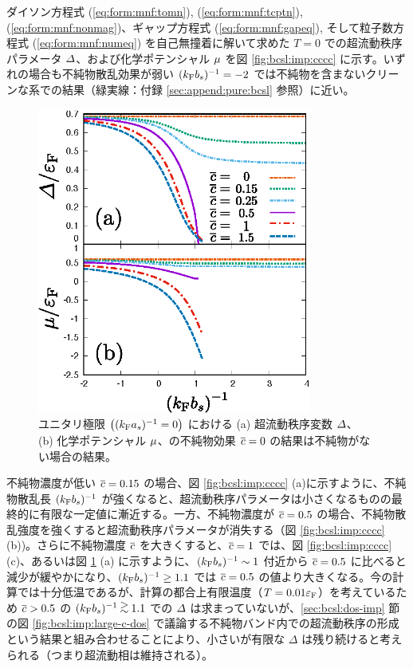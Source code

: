 ダイソン方程式 (\ref{eq:form:mnf:tomn}), (\ref{eq:form:mnf:tcptn}), (\ref{eq:form:mnf:nonmag})、ギャップ方程式 (\ref{eq:form:mnf:gapeq}), そして粒子数方程式 (\ref{eq:form:mnf:numeq}) を自己無撞着に解いて求めた $T=0$ での超流動秩序パラメータ $\varDelta$、および化学ポテンシャル $\mu$ を図 \ref{fig:bcsl:imp:cccc} に示す。いずれの場合も不純物散乱効果が弱い $(k_{\text{F}} b_s)^{-1}=-2$ では不純物を含まないクリーンな系での結果（緑実線：付録 \ref{sec:append:pure:bcsl} 参照）に近い。


\begin{figure}[t]
\centering
\includegraphics[width=90mm]{eps/bcsl-del-cpt-ias000.eps}
\caption{ユニタリ極限 $\left((k_{\text{F}} a_s)^{-1}=0\right)$ における (a) 超流動秩序変数 $\varDelta$、 (b) 化学ポテンシャル $\mu$、の不純物効果 $\overline{c} = 0 $ の結果は不純物がない場合の結果。}
\label{fig:bcsl:imp:ias000}
\end{figure}


不純物濃度が低い $\overline{c}=0.15$ の場合、図 \ref{fig:bcsl:imp:cccc} (a)に示すように、不純物散乱長 $(k_{\text{F}} b_s)^{-1}$ が強くなると、超流動秩序パラメータは小さくなるものの最終的に有限な一定値に漸近する。一方、不純物濃度が $\overline{c} = 0.5$ の場合、不純物散乱強度を強くすると超流動秩序パラメータが消失する（図 \ref{fig:bcsl:imp:cccc} (b))。さらに不純物濃度 $\overline{c}$ を大きくすると、$\overline{c}=1$ では、図 \ref{fig:bcsl:imp:cccc} (c)、あるいは図 \ref{fig:bcsl:imp:ias000} (a) に示すように、$(k_{\text{F}} b_s)^{-1}\sim 1$ 付近から $\overline{c}=0.5$ に比べると減少が緩やかになり、$(k_{\text{F}} b_s)^{-1}\ge1.1$ では $\overline{c}=0.5$ の値より大きくなる。今の計算では十分低温であるが、計算の都合上有限温度（$T=0.01 \varepsilon_{\text{F}}$）を考えているため $\overline{c} > 0.5$ の $\bskfi \gtsim 1.1$ での $\varDelta$ は求まっていないが、\ref{sec:bcsl:dos-imp} 節の図 \ref{fig:bcsl:imp:large-c-dos} で議論する不純物バンド内での超流動秩序の形成という結果と組み合わせることにより、小さいが有限な $\varDelta$ は残り続けると考えられる（つまり超流動相は維持される）。

